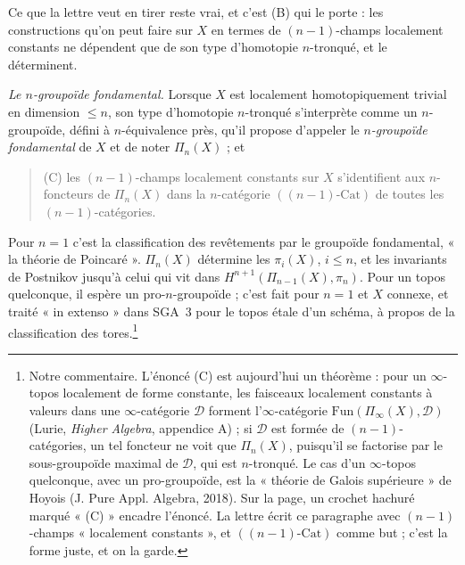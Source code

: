 \documentclass[11pt,a4paper]{article}
\begin{document}
Ce que la lettre veut en tirer reste vrai, et c'est (B) qui le porte : les
constructions qu'on peut faire sur $X$ en termes de $(n-1)$-champs
localement constants ne dépendent que de son type d'homotopie
$n$-tronqué, et le déterminent.

\emph{Le $n$-groupoïde fondamental.} Lorsque $X$ est localement
homotopiquement trivial en dimension $\leqslant n$, son type d'homotopie
$n$-tronqué s'interprète comme un $n$-groupoïde, défini à $n$-équivalence
près, qu'il propose d'appeler le \emph{$n$-groupoïde fondamental} de $X$ et
de noter $\Pi_n(X)$ ; et

\begin{quote}
(C) les $(n-1)$-champs localement constants sur $X$ s'identifient aux
$n$-foncteurs de $\Pi_n(X)$ dans la $n$-catégorie $((n-1)\text{-}\mathrm{Cat})$
de toutes les $(n-1)$-catégories.
\end{quote}

Pour $n = 1$ c'est la classification des revêtements par le
groupoïde fondamental, « la théorie de Poincaré ». $\Pi_n(X)$ détermine les
$\pi_i(X)$, $i \leqslant n$, et les invariants de Postnikov jusqu'à celui
qui vit dans $H^{n+1}(\Pi_{n-1}(X),\pi_n)$. Pour un topos quelconque, il
espère un pro-$n$-groupoïde ; c'est fait pour $n = 1$ et $X$ connexe, et
traité « in extenso » dans SGA~3 pour le topos étale d'un schéma, à propos de
la classification des tores.\footnote{Notre commentaire. L'énoncé (C) est
aujourd'hui un théorème : pour un $\infty$-topos localement de forme
constante, les faisceaux localement constants à valeurs dans une
$\infty$-catégorie $\mathcal{D}$ forment l'$\infty$-catégorie
$\mathrm{Fun}(\Pi_\infty(X),\mathcal{D})$ (Lurie, \emph{Higher Algebra},
appendice A) ; si $\mathcal{D}$ est formée de $(n-1)$-catégories, un tel
foncteur ne voit que $\Pi_n(X)$, puisqu'il se factorise par le
sous-groupoïde maximal de $\mathcal{D}$, qui est $n$-tronqué. Le cas d'un
$\infty$-topos quelconque, avec un pro-groupoïde, est la « théorie de Galois
supérieure » de Hoyois (J. Pure Appl. Algebra, 2018). Sur la page, un
crochet hachuré marqué « (C) » encadre l'énoncé. La lettre écrit ce
paragraphe avec $(n-1)$-champs « localement constants », et
$((n-1)\text{-}\mathrm{Cat})$ comme but ; c'est la forme juste, et on la
garde.}
\end{document}
